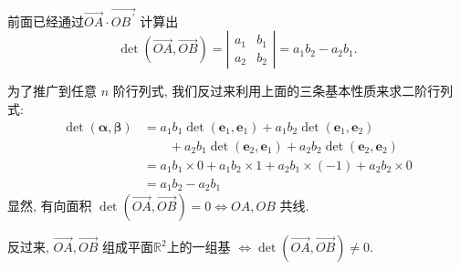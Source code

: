 \documentclass[10pt,punct]{ctexbeamer}
\begin{document}
\begin{frame}
    前面已经通过$\overrightarrow{O A} \cdot \overrightarrow{O B^{\, \prime}}$ 计算出
    $$\operatorname{det}(\overrightarrow{O A}, \overrightarrow{O B})=\left|\begin{array}{ll}a_1 & b_1 \\ a_2 & b_2\end{array}\right|=a_1 b_2-a_2 b_1.$$


    为了推广到任意 $n$ 阶行列式, 我们反过来利用上面的三条基本性质来求二阶行列式:
$$\begin{aligned}    \operatorname{det}(\boldsymbol{\alpha}, \boldsymbol{\beta})
        & = a_1 b_1 \operatorname{det}\left(\boldsymbol{e}_1, \boldsymbol{e}_1\right)
        +a_1 b_2 \operatorname{det}\left(\boldsymbol{e}_1, \boldsymbol{e}_2\right)\\
        & \qquad
        +a_2 b_1 \operatorname{det}\left(\boldsymbol{e}_2, \boldsymbol{e}_1\right)
        +a_2 b_2 \operatorname{det}\left(\boldsymbol{e}_2, \boldsymbol{e}_2\right) \\
        & = a_1 b_1 \times 0+a_1 b_2 \times 1+a_2 b_1 \times(-1)+a_2 b_2 \times 0 \\ &=a_1 b_2-a_2 b_1 \end{aligned}$$
    显然, 有向面积 $\operatorname{det}(\overrightarrow{O A}, \overrightarrow{O B})=0 \Leftrightarrow O A, O B$ 共线.


    反过来, $\overrightarrow{O A}, \overrightarrow{O B}$ 组成平面$\mathbb{R}^2$上的一组基 $\Leftrightarrow \operatorname{det}(\overrightarrow{O A}, \overrightarrow{O B}) \neq 0$.

\end{frame}
\end{document}
